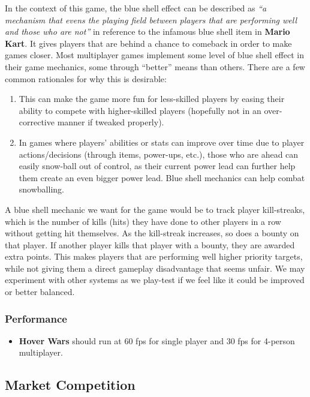 \documentclass{article}
\newcommand{\namenobold}{Hover Wars}
\newcommand{\name}{\textbf{\namenobold}}
\theoremstyle{definition}
\begin{document}
In the context of this game, the blue shell effect can be described as
\textit{``a mechanism that evens the playing field between players that are
performing well and those who are not''} in reference to the infamous blue
shell item in \textbf{Mario Kart}. It gives players that are behind a chance to
comeback in order to make games closer. Most multiplayer games implement some
level of blue shell effect in their game mechanics, some through ``better''
means than others. There are a few common rationales for why this is desirable:
\begin{enumerate}
  \item This can make the game more fun for less-skilled players by
    easing their ability to compete with higher-skilled players (hopefully not
    in an over-corrective manner if tweaked properly).
  \item In games where players' abilities or stats can improve over time due to
    player actions/decisions (through items, power-ups, etc.), those who are
    ahead can easily snow-ball out of control, as their current power lead can
    further help them create an even bigger power lead. Blue shell mechanics
    can help combat snowballing.
\end{enumerate}

A blue shell mechanic we want for the game would be to track player
kill-streaks, which is the number of kills (hits) they have done to other
players in a row without getting hit themselves. As the kill-streak increases,
so does a bounty on that player. If another player kills that player with
a bounty, they are awarded extra points. This makes players that are performing
well higher priority targets, while not giving them a direct gameplay
disadvantage that seems unfair. We may experiment with other systems as we
play-test if we feel like it could be improved or better balanced.

\subsubsection{Performance}

\begin{itemize}
  \item \name{} should run at 60 fps for single player and 30 fps for
    4-person multiplayer.
\end{itemize}

\subsection{Market Competition}
\end{document}
